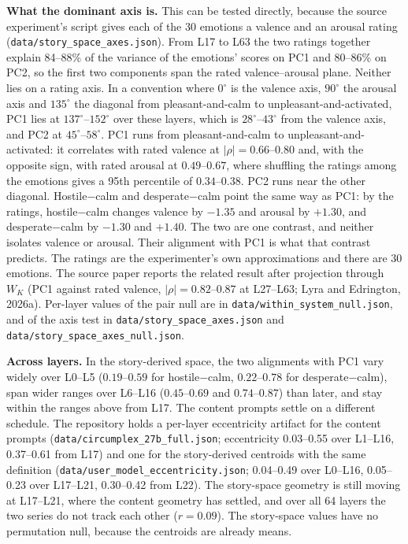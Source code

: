 \documentclass[11pt,a4paper]{article}
\begin{document}
\textbf{What the dominant axis is.} This can be tested directly, because the source experiment's script gives each of the 30 emotions a valence and an arousal rating (\texttt{data/\allowbreak story\_\allowbreak space\_\allowbreak axes.json}). From L17 to L63 the two ratings together explain 84--88\% of the variance of the emotions' scores on PC1 and 80--86\% on PC2, so the first two components span the rated valence--arousal plane. Neither lies on a rating axis. In a convention where $0^\circ$ is the valence axis, $90^\circ$ the arousal axis and $135^\circ$ the diagonal from pleasant-and-calm to unpleasant-and-activated, PC1 lies at $137^\circ$--$152^\circ$ over these layers, which is $28^\circ$--$43^\circ$ from the valence axis, and PC2 at $45^\circ$--$58^\circ$. PC1 runs from pleasant-and-calm to unpleasant-and-activated: it correlates with rated valence at $|\rho| = 0.66$--$0.80$ and, with the opposite sign, with rated arousal at $0.49$--$0.67$, where shuffling the ratings among the emotions gives a 95th percentile of $0.34$--$0.38$. PC2 runs near the other diagonal. Hostile$-$calm and desperate$-$calm point the same way as PC1: by the ratings, hostile$-$calm changes valence by $-1.35$ and arousal by $+1.30$, and desperate$-$calm by $-1.30$ and $+1.40$. The two are one contrast, and neither isolates valence or arousal. Their alignment with PC1 is what that contrast predicts. The ratings are the experimenter's own approximations and there are 30 emotions. The source paper reports the related result after projection through $W_K$ (PC1 against rated valence, $|\rho| = 0.82$--$0.87$ at L27--L63; Lyra and Edrington, 2026a). Per-layer values of the pair null are in \texttt{data/\allowbreak within\_system\_null.json}, and of the axis test in \texttt{data/\allowbreak story\_space\_axes.json} and \texttt{data/\allowbreak story\_space\_axes\_null.json}.

\textbf{Across layers.} In the story-derived space, the two alignments with PC1 vary widely over L0--L5 ($0.19$--$0.59$ for hostile$-$calm, $0.22$--$0.78$ for desperate$-$calm), span wider ranges over L6--L16 ($0.45$--$0.69$ and $0.74$--$0.87$) than later, and stay within the ranges above from L17. The content prompts settle on a different schedule. The repository holds a per-layer eccentricity artifact for the content prompts (\texttt{data/\allowbreak circumplex\_27b\_full.json}; eccentricity 0.03--0.55 over L1--L16, 0.37--0.61 from L17) and one for the story-derived centroids with the same definition (\texttt{data/\allowbreak user\_model\_eccentricity.json}; 0.04--0.49 over L0--L16, 0.05--0.23 over L17--L21, 0.30--0.42 from L22). The story-space geometry is still moving at L17--L21, where the content geometry has settled, and over all 64 layers the two series do not track each other ($r = 0.09$). The story-space values have no permutation null, because the centroids are already means.
\end{document}
